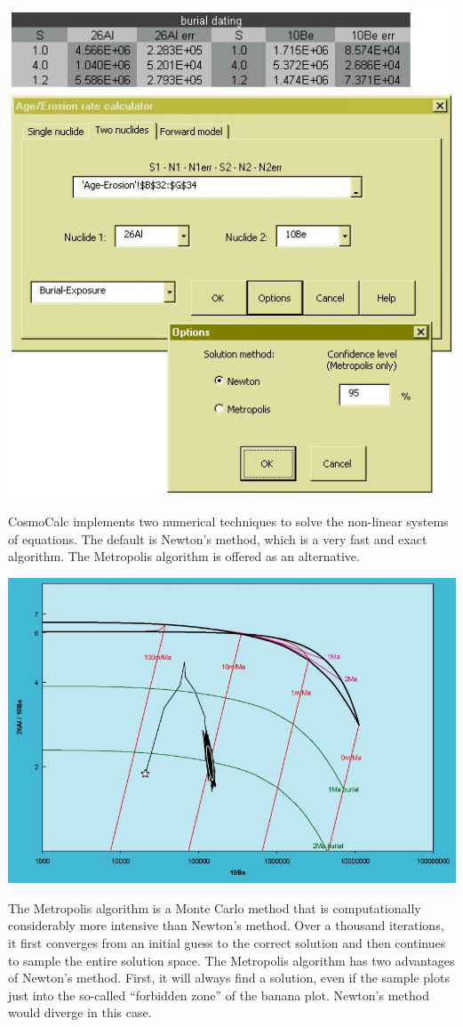 \documentclass[12pt]{article}
\begin{document}
\begin{minipage}[tbp]{\textwidth}
  \begin{center}
  \includegraphics[width=.6\textwidth]{twoNuclideOptions.jpg}\\
  \end{center}
  CosmoCalc   implements  two  numerical   techniques  to   solve  the
  non-linear systems  of equations.   The default is  Newton's method,
  which is a very fast  and exact algorithm.  The Metropolis algorithm
  is offered as an alternative.
  \\
\end{minipage}

\begin{minipage}[tbp]{\textwidth}
\begin{center}
  \includegraphics[width=\textwidth]{metropolisBananaSmall.jpg}\\
\end{center}
  The  Metropolis   algorithm  is  a   Monte  Carlo  method   that  is
  computationally  considerably more intensive  than Newton's  method. 
  Over a thousand iterations, it first converges from an initial guess
  to  the correct  solution and  then continues  to sample  the entire
  solution  space.  The  Metropolis  algorithm has  two advantages  of
  Newton's method. First, it will  always find a solution, even if the
  sample  plots just  into  the so-called  ``forbidden  zone'' of  the
  banana plot. Newton's method would diverge in this case.
  \\
\end{minipage}
\end{document}
